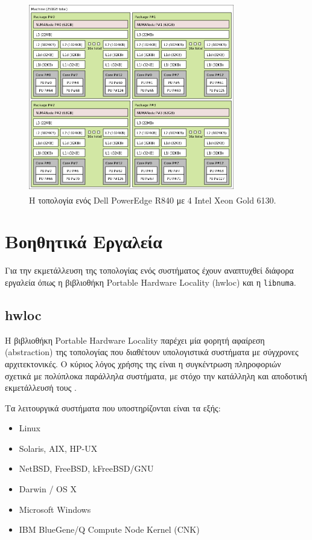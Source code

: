 \begin{figure}[t]
	\centering
	\includegraphics[width=0.8\textwidth]{Figures/parade-topo.png}
	\linebreak
	\caption{Η τοπολογία ενός Dell PowerEdge R840 με 4 Intel\textsuperscript{\textregistered} Xeon\textsuperscript{\textregistered} Gold 6130.}
	\label{fig:parade-topo}
\end{figure}


\section{Βοηθητικά Εργαλεία}
\label{sec:Utility Tools}
Για την εκμετάλλευση της τοπολογίας ενός συστήματος έχουν αναπτυχθεί διάφορα εργαλεία όπως η βιβλιοθήκη Portable Hardware Locality (hwloc) και η \texttt{libnuma}.

\subsection{hwloc}
\label{ssec:hwloc}
Η βιβλιοθήκη Portable Hardware Locality παρέχει μία φορητή αφαίρεση (abstraction) της τοπολογίας που διαθέτουν υπολογιστικά συστήματα με σύγχρονες αρχιτεκτονικές. Ο κύριος λόγος χρήσης της είναι η συγκέντρωση πληροφοριών σχετικά με πολύπλοκα παράλληλα συστήματα, με στόχο την κατάλληλη και αποδοτική εκμετάλλευσή τους \cite{broquedis2010hwloc}. 

\noindent Τα λειτουργικά συστήματα που υποστηρίζονται είναι τα εξής:
\begin{itemize}
	\item Linux
	\item Solaris, AIX, HP-UX
	\item NetBSD, FreeBSD, kFreeBSD/GNU
	\item Darwin / OS X
	\item Microsoft Windows
	\item IBM BlueGene/Q Compute Node Kernel (CNK)
\end{itemize}

